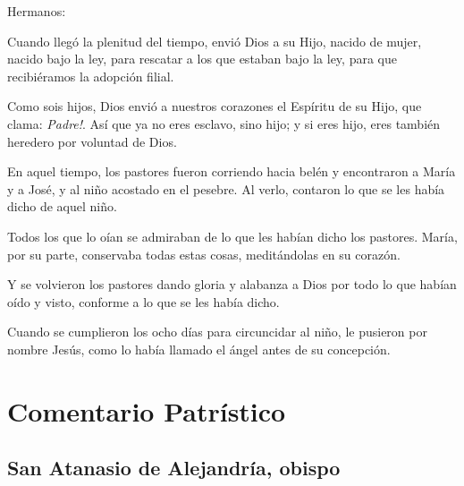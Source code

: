 
\begin{scripture}
	Hermanos:
	
	Cuando llegó la plenitud del tiempo, envió Dios a su Hijo, nacido de mujer, nacido bajo la ley, para rescatar a los que estaban bajo la ley, para que recibiéramos la adopción filial.
	
	Como sois hijos, Dios envió a nuestros corazones el Espíritu de su Hijo, que clama: \emph{ Padre!}. Así que ya no eres esclavo, sino hijo; y si eres hijo, eres también heredero por voluntad de Dios.
\end{scripture}


 


\begin{scripture}
	En aquel tiempo, los pastores fueron corriendo hacia belén y encontraron a María y a José, y al niño acostado en el pesebre. Al verlo, contaron lo que se les había dicho de aquel niño.
	
	Todos los que lo oían se admiraban de lo que les habían dicho los pastores. María, por su parte, conservaba todas estas cosas, meditándolas en su corazón.
	
	Y se volvieron los pastores dando gloria y alabanza a Dios por todo lo que habían oído y visto, conforme a lo que se les había dicho.
	
	Cuando se cumplieron los ocho días para circuncidar al niño, le pusieron por nombre Jesús, como lo había llamado el ángel antes de su concepción.
\end{scripture}

\newsection

\section{Comentario Patrístico}

\subsection{San Atanasio de Alejandría, obispo}



